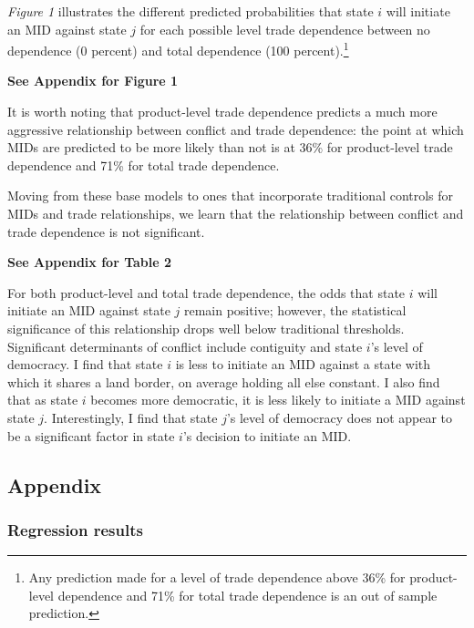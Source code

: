 \documentclass[
  letterpaper,
]{article}
\begin{document}
\emph{Figure 1} illustrates the different predicted probabilities that
state \(i\) will initiate an MID against state \(j\) for each possible
level trade dependence between no dependence (0 percent) and total
dependence (100 percent).\footnote{Any prediction made for a level of
  trade dependence above 36\% for product-level dependence and 71\% for
  total trade dependence is an out of sample prediction.}

\textbf{See Appendix for Figure 1}

It is worth noting that product-level trade dependence predicts a much
more aggressive relationship between conflict and trade dependence: the
point at which MIDs are predicted to be more likely than not is at 36\%
for product-level trade dependence and 71\% for total trade dependence.

Moving from these base models to ones that incorporate traditional
controls for MIDs and trade relationships, we learn that the
relationship between conflict and trade dependence is not significant.

\textbf{See Appendix for Table 2}

For both product-level and total trade dependence, the odds that state
\(i\) will initiate an MID against state \(j\) remain positive; however,
the statistical significance of this relationship drops well below
traditional thresholds. Significant determinants of conflict include
contiguity and state \(i\)'s level of democracy. I find that state \(i\)
is less to initiate an MID against a state with which it shares a land
border, on average holding all else constant. I also find that as state
\(i\) becomes more democratic, it is less likely to initiate a MID
against state \(j\). Interestingly, I find that state \(j\)'s level of
democracy does not appear to be a significant factor in state \(i\)'s
decision to initiate an MID.

\newpage{}

\hypertarget{appendix}{%
\subsection{Appendix}\label{appendix}}

\hypertarget{regression-results}{%
\subsubsection{Regression results}\label{regression-results}}
\end{document}

